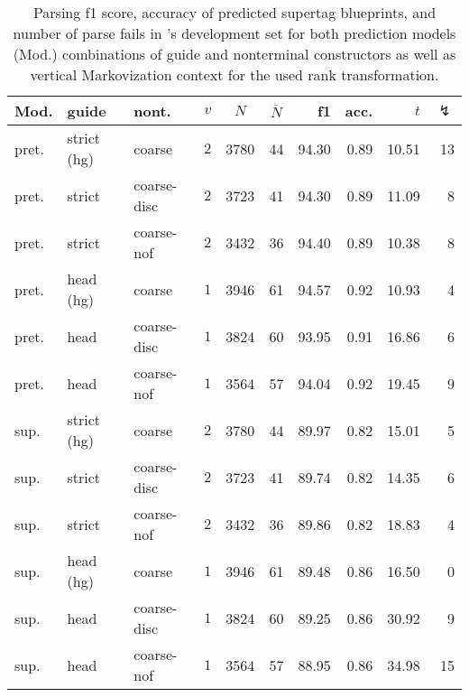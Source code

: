 \documentclass[../../document.tex]{subfiles}
\begin{document}
    \begin{table}
        \caption{\label{tbl:experiments:dptb:dcp}
        Parsing f1 score, accuracy of predicted  supertag blueprints, and number of parse fails in 's development set for both prediction models (Mod.) combinations of guide and nonterminal constructors as well as vertical Markovization context for the used rank transformation.
        }
        \centering
        \setlength{\tabcolsep}{4pt}
        \vspace{.2cm}
        \begin{tabular}{lllc|cc|rrrr}
            \toprule
Mod. &  guide &   nont.   &\(v\)   & $N$ & $\overline{N}$ & f1 & acc. & $t$ & $\lightning$ \\ \hline \rowcolor{black!10}
pret. & strict (hg) &  coarse       & \(2\) & 3780 & 44 & 94.30 & 0.89 & 10.51 & 13  \\\hline
pret. & strict      &  coarse-disc  & \(2\) & 3723 & 41  & 94.30 & 0.89 & 11.09 & 8  \\
pret. & strict      &  coarse-nof   & \(2\) & 3432 & 36 & 94.40 & 0.89 & 10.38 & 8  \\ \hline\rowcolor{black!10}
pret. & head  (hg)  &  coarse       & \(1\) & 3946 & 61 & 94.57 & 0.92 & 10.93 & 4  \\\hline
pret. & head        &  coarse-disc  & \(1\) & 3824 & 60 & 93.95 & 0.91 & 16.86 & 6  \\
pret. & head        &  coarse-nof   & \(1\) & 3564 & 57 & 94.04 & 0.92 & 19.45 & 9  \\
\midrule \rowcolor{black!10}
sup. & strict (hg) &  coarse        & \(2\) & 3780 & 44 & 89.97 & 0.82 & 15.01 & 5  \\\hline
sup. & strict    &  coarse-disc     & \(2\) & 3723 & 41 & 89.74 & 0.82 & 14.35 & 6  \\
sup. & strict     &  coarse-nof     & \(2\) & 3432 & 36 & 89.86 & 0.82 & 18.83 & 4  \\\hline\rowcolor{black!10}
sup. & head (hg)  &  coarse         & \(1\) & 3946 & 61 & 89.48 & 0.86 & 16.50 & 0  \\\hline
sup. & head      &  coarse-disc     & \(1\) & 3824 & 60 & 89.25 & 0.86 & 30.92 & 9  \\
sup. & head       &  coarse-nof     & \(1\) & 3564 & 57 & 88.95 & 0.86 & 34.98 & 15  \\
    \bottomrule
        \end{tabular}
    \end{table}
\end{document}
